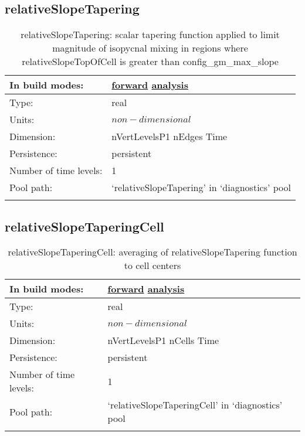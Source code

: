 \subsection[relativeSlopeTapering]{relativeSlopeTapering}
\label{subsec:var_sec_diagnostics_relativeSlopeTapering}
\begin{center}
\begin{longtable}{| p{2.0in} | p{4.0in} |}
        \hline 
        In build modes: & \hyperref[subsec:forward_var_tab_diagnostics]{forward} \hyperref[subsec:analysis_var_tab_diagnostics]{analysis} \\
        \hline 
        Type: & real \\
        \hline 
        Units: & $non-dimensional$ \\
        \hline 
        Dimension: & nVertLevelsP1 nEdges Time \\
        \hline 
        Persistence: & persistent \\
        \hline 
        Number of time levels: & 1 \\
        \hline 
            Pool path: & `relativeSlopeTapering' in `diagnostics' pool \\
		 \hline 
    \caption{relativeSlopeTapering: scalar tapering function applied to limit magnitude of isopycnal mixing in regions where relativeSlopeTopOfCell is greater than config\_gm\_max\_slope}
\end{longtable}
\end{center}
\subsection[relativeSlopeTaperingCell]{relativeSlopeTaperingCell}
\label{subsec:var_sec_diagnostics_relativeSlopeTaperingCell}
\begin{center}
\begin{longtable}{| p{2.0in} | p{4.0in} |}
        \hline 
        In build modes: & \hyperref[subsec:forward_var_tab_diagnostics]{forward} \hyperref[subsec:analysis_var_tab_diagnostics]{analysis} \\
        \hline 
        Type: & real \\
        \hline 
        Units: & $non-dimensional$ \\
        \hline 
        Dimension: & nVertLevelsP1 nCells Time \\
        \hline 
        Persistence: & persistent \\
        \hline 
        Number of time levels: & 1 \\
        \hline 
            Pool path: & `relativeSlopeTaperingCell' in `diagnostics' pool \\
		 \hline 
    \caption{relativeSlopeTaperingCell: averaging of relativeSlopeTapering function to cell centers}
\end{longtable}
\end{center}
